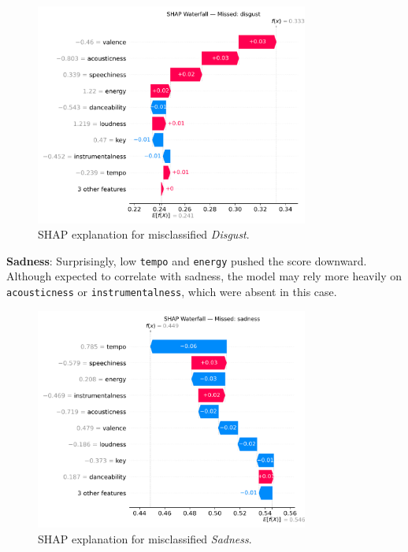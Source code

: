 \documentclass{article}
\begin{document}
\begin{figure}[H]
\centering
\includegraphics[width=0.8\textwidth]{Graphics/shap_missed_labels/disgust_missed_shap_waterfall.png}
\caption{SHAP explanation for misclassified \textit{Disgust}.}
\label{fig:shap_disgust_waterfall}
\end{figure}

\textbf{Sadness}: Surprisingly, low \texttt{tempo} and \texttt{energy} pushed the score downward. Although expected to correlate with sadness, the model may rely more heavily on \texttt{acousticness} or \texttt{instrumentalness}, which were absent in this case.
\FloatBarrier

\begin{figure}[H]
\centering
\includegraphics[width=0.8\textwidth]{Graphics/shap_missed_labels/sadness_missed_shap_waterfall.png}
\caption{SHAP explanation for misclassified \textit{Sadness}.}
\label{fig:shap_sadness_waterfall}
\end{figure}
\end{document}
